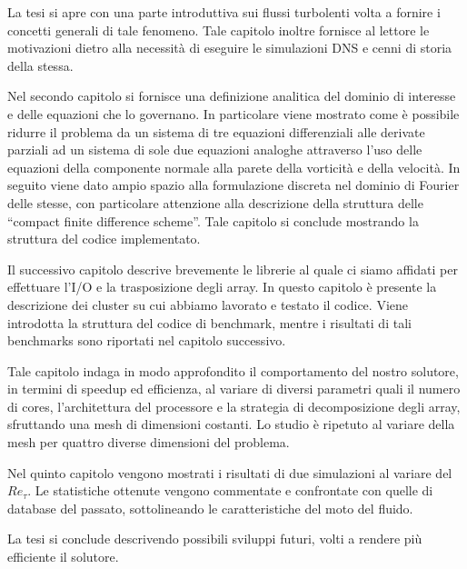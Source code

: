La tesi si apre con una parte introduttiva sui flussi turbolenti volta a fornire i concetti generali di tale fenomeno. Tale capitolo inoltre fornisce al lettore le motivazioni dietro alla necessità di eseguire le simulazioni DNS e cenni di storia della stessa.\par
Nel secondo capitolo si fornisce una definizione analitica del dominio di interesse e delle equazioni che lo governano. In particolare viene mostrato come è possibile ridurre il problema da un sistema di tre equazioni differenziali alle derivate parziali ad un sistema di sole due equazioni analoghe attraverso l'uso delle equazioni della componente normale alla parete della vorticità e della velocità. In seguito viene dato ampio spazio alla formulazione discreta nel dominio di Fourier delle stesse, con particolare attenzione alla descrizione della struttura delle ``compact finite difference scheme''.  Tale capitolo si conclude mostrando la struttura del codice implementato.\par
Il successivo capitolo descrive brevemente le librerie al quale ci siamo affidati per effettuare l'I/O e la trasposizione degli array. In questo capitolo è presente la descrizione dei cluster su cui abbiamo lavorato e testato il codice. Viene introdotta la struttura del codice di benchmark, mentre i risultati di tali benchmarks sono riportati nel capitolo successivo. \par
Tale capitolo indaga in modo approfondito il comportamento del nostro solutore, in termini di speedup ed efficienza, al variare di diversi parametri quali il numero di cores, l'architettura del processore e la strategia di decomposizione degli array, sfruttando una mesh di dimensioni costanti. Lo studio è ripetuto al variare della mesh per quattro diverse dimensioni del problema.\par
Nel quinto capitolo vengono mostrati i risultati di due simulazioni al variare del $Re_{\tau}$. Le statistiche ottenute vengono commentate e confrontate con quelle di database del passato, sottolineando le caratteristiche del moto del fluido.\par
La tesi si conclude descrivendo possibili sviluppi futuri, volti a rendere più efficiente il solutore.



